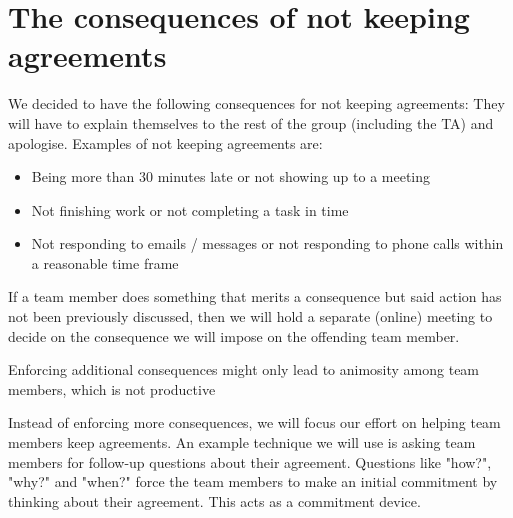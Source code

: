 \section{The consequences of not keeping agreements}

We decided to have the following consequences for not keeping agreements: They will have to explain themselves to the
rest of the group (including the TA) and apologise.
Examples of not keeping agreements are:
\begin{itemize}
  \item Being more than 30 minutes late or not showing up to a meeting
  \item Not finishing work or not completing a task in time
  \item Not responding to emails / messages or not responding to phone calls within a reasonable time frame
\end{itemize}

If a team member does something that merits a consequence but said action has not been previously discussed,
then we will hold a separate (online) meeting to decide on the consequence we will impose on the offending team member.

Enforcing additional consequences might only lead to animosity among team members,
which is not productive

Instead of enforcing more consequences, we will focus our effort on helping team members keep agreements.
An example technique we will use is asking team members for follow-up questions about their agreement.
Questions like "how?", "why?" and "when?" force the team members to make an initial commitment by thinking about their agreement.
This acts as a commitment device.
